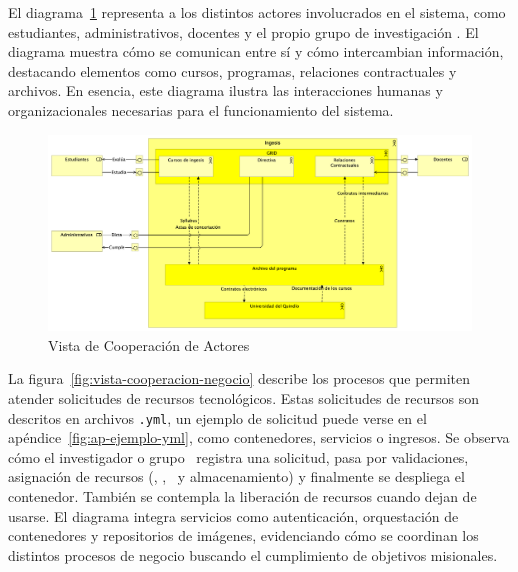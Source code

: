 El diagrama~\ref{fig:vista-cooperacion-actores} representa a los distintos actores involucrados en el sistema, como estudiantes, administrativos, docentes y el propio grupo de investigación \GRID. El diagrama muestra cómo se comunican entre sí y cómo intercambian información, destacando elementos como cursos, programas, relaciones contractuales y archivos. En esencia, este diagrama ilustra las interacciones humanas y organizacionales necesarias para el funcionamiento del sistema.

\begin{figure}[H]
    \centering
    \includegraphics[scale=0.16]{tablas-images/cp6/Actor-Cooperation-view.png}
    \caption{Vista de Cooperación de Actores}\label{fig:vista-cooperacion-actores}
\end{figure}
\noindent
La figura~\ref{fig:vista-cooperacion-negocio} describe los procesos que permiten atender solicitudes de recursos tecnológicos. Estas solicitudes de recursos son descritos en archivos \texttt{.yml}, un ejemplo de solicitud puede verse en el apéndice~\ref{fig:ap-ejemplo-yml}, como contenedores, servicios o ingresos. Se observa cómo el investigador o grupo \GRID\ registra una solicitud, pasa por validaciones, asignación de recursos (\CPU, \RAM, \GPU\ y almacenamiento) y finalmente se despliega el contenedor. También se contempla la liberación de recursos cuando dejan de usarse. El diagrama integra servicios como autenticación, orquestación de contenedores y repositorios de imágenes, evidenciando cómo se coordinan los distintos procesos de negocio buscando el cumplimiento de objetivos misionales.

